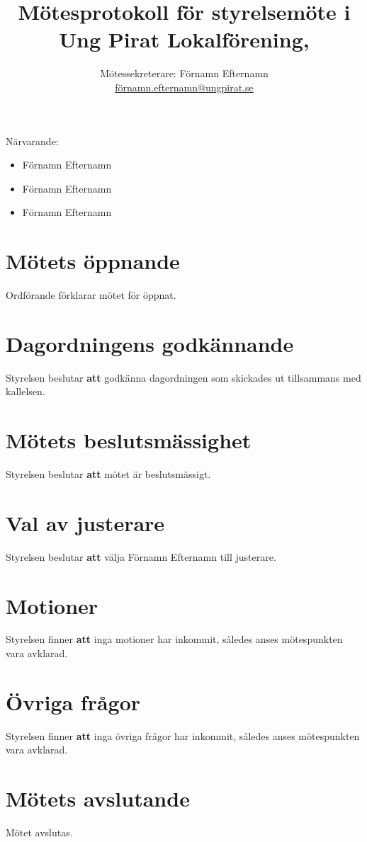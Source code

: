 \documentclass[a4paper,10pt]{article}	%
\title{Mötesprotokoll för styrelsemöte i Ung Pirat Lokalförening,}
\author{Mötessekreterare: Förnamn Efternamn\\
  \url{förnamn.efternamn@ungpirat.se}}
\begin{document}
\maketitle

\newpage

Närvarande:
\begin{itemize}
\item Förnamn Efternamn
\item Förnamn Efternamn
\item Förnamn Efternamn
\end{itemize}

\section{Mötets öppnande}
Ordförande förklarar mötet för öppnat.

\section{Dagordningens godkännande}
Styrelsen beslutar \textbf{att} godkänna dagordningen som skickades ut tillsammans med kallelsen.

\section{Mötets beslutsmässighet}
Styrelsen beslutar \textbf{att} mötet är beslutsmässigt.

\section{Val av justerare}
Styrelsen beslutar \textbf{att} välja Förnamn Efternamn till justerare.

\section{Motioner}
Styrelsen finner \textbf{att} inga motioner har inkommit, således anses mötespunkten vara avklarad.

\section{Övriga frågor}
Styrelsen finner \textbf{att} inga övriga frågor har inkommit, således anses mötespunkten vara avklarad.

\section{Mötets avslutande}
Mötet avslutas.
\end{document}
